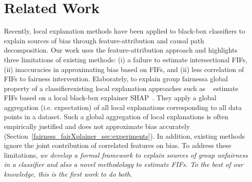 \begin{example}
\end{example}



\section{Related Work}
\label{fairness_fairXplainer_sec:related_work}
Recently, local explanation methods have been applied to black-box classifiers to explain sources of bias through feature-attribution\cite{begley2020explainability,lundberg2020explaining} and causal path decomposition\cite{pan2021explaining}. Our work uses the feature-attribution approach and highlights three limitations of existing methods: (i) a failure to estimate intersectional FIFs, (ii) inaccuracies in approximating bias based on FIFs, and (ii) less correlation of FIFs to fairness intervention. Elaborately, to explain group fairness\textemdash a global property of a classifier\textemdash existing local explanation approaches such as ~\cite{begley2020explainability,lundberg2020explaining} estimate FIFs based on a local black-box explainer SHAP~\cite{lundberg2017unified}. They apply a global aggregation (i.e. expectation) of all local explanations corresponding to all data points in a dataset. Such a global aggregation of local explanations is often empirically justified and does not approximate bias accurately (Section~\ref{fairness_fairXplainer_sec:experiments}).  In addition, existing methods ignore the joint contribution of correlated features on bias. To address these limitations, \textit{we develop a formal framework to explain sources of group unfairness in a classifier and also a novel methodology to estimate FIFs. To the best of our knowledge, this is the first work to do both}.


